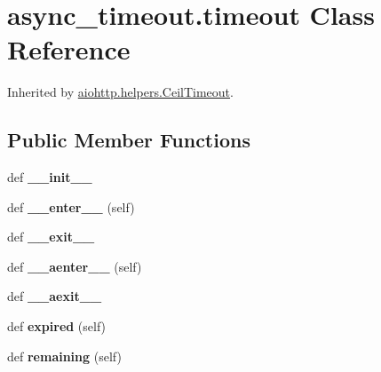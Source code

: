 \hypertarget{classasync__timeout_1_1timeout}{}\section{async\+\_\+timeout.\+timeout Class Reference}
\label{classasync__timeout_1_1timeout}


Inherited by \hyperlink{classaiohttp_1_1helpers_1_1_ceil_timeout}{aiohttp.\+helpers.\+Ceil\+Timeout}.

\subsection*{Public Member Functions}
\begin{DoxyCompactItemize}
\item 
\mbox{\label{classasync__timeout_1_1timeout_a54dad3986587388d0fd50b0b67301fa3}} 
def {\bfseries \+\_\+\+\_\+init\+\_\+\+\_\+}
\item 
\mbox{\label{classasync__timeout_1_1timeout_a9d0b8c434b16a729376394df07a48378}} 
def {\bfseries \+\_\+\+\_\+enter\+\_\+\+\_\+} (self)
\item 
\mbox{\label{classasync__timeout_1_1timeout_a0d8437d5a09ab0fb4a5746d548a03d58}} 
def {\bfseries \+\_\+\+\_\+exit\+\_\+\+\_\+}
\item 
\mbox{\label{classasync__timeout_1_1timeout_a4b964259682180282b971c4259b96327}} 
def {\bfseries \+\_\+\+\_\+aenter\+\_\+\+\_\+} (self)
\item 
\mbox{\label{classasync__timeout_1_1timeout_a36e76b8fb17f33937b37e0a6ad0aecdc}} 
def {\bfseries \+\_\+\+\_\+aexit\+\_\+\+\_\+}
\item 
\mbox{\label{classasync__timeout_1_1timeout_ac82e95d08f75c52598335dca904a8e94}} 
def {\bfseries expired} (self)
\item 
\mbox{\label{classasync__timeout_1_1timeout_a65812b63fc942f80d0515746a2844a5d}} 
def {\bfseries remaining} (self)
\end{DoxyCompactItemize}


